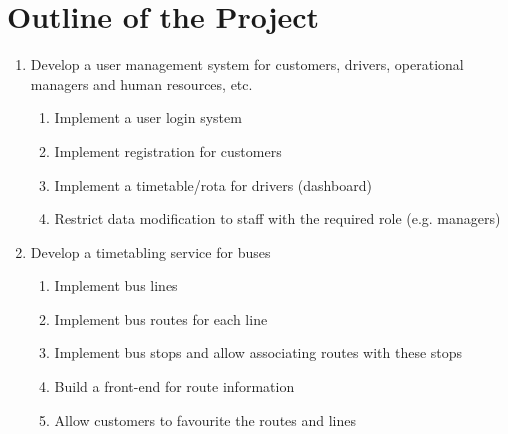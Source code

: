 \section{Outline of the Project}

\begin{enumerate}
  \item Develop a user management system for customers, drivers, operational
  managers and human resources, etc.
  \begin{enumerate}
    \item Implement a user login system
    \item Implement registration for customers
    \item Implement a timetable/rota for drivers (dashboard)
    \item Restrict data modification to staff with the required role (e.g. managers)
  \end{enumerate}
  \item Develop a timetabling service for buses
  \begin{enumerate}
    \item Implement bus lines
    \item Implement bus routes for each line
    \item Implement bus stops and allow associating routes with these stops
    \item Build a front-end for route information
    \item Allow customers to favourite the routes and lines
  \end{enumerate}
\end{enumerate}
